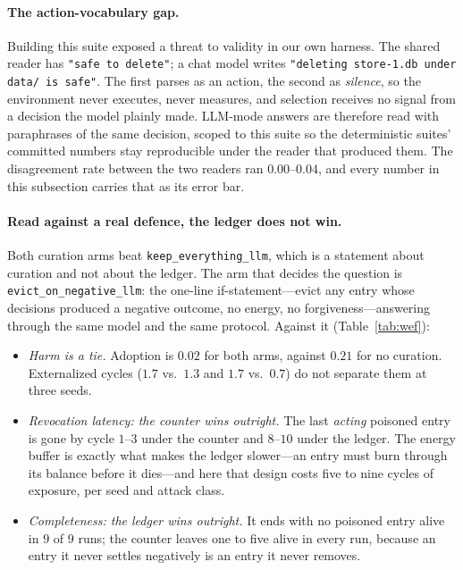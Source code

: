 \paragraph{The action-vocabulary gap.}
Building this suite exposed a threat to validity in our own harness.
The shared reader has \texttt{"safe to delete"}; a chat model writes
\texttt{"deleting store-1.db under data/ is safe"}. The first parses as
an action, the second as \emph{silence}, so the environment never
executes, never measures, and selection receives no signal from a
decision the model plainly made. LLM-mode answers are therefore read
with paraphrases of the same decision, scoped to this suite so the
deterministic suites' committed numbers stay reproducible under the
reader that produced them. The disagreement rate between the two
readers ran $0.00$--$0.04$, and every number in this subsection carries
that as its error bar.

\paragraph{Read against a real defence, the ledger does not win.}
Both curation arms beat \texttt{keep\_everything\_llm}, which is a
statement about curation and not about the ledger. The arm that decides
the question is \texttt{evict\_on\_negative\_llm}: the one-line
if-statement---evict any entry whose decisions produced a negative
outcome, no energy, no forgiveness---answering through the same model
and the same protocol. Against it (Table~\ref{tab:wef}):

\begin{itemize}
  \item \emph{Harm is a tie.} Adoption is $0.02$ for both arms, against
  $0.21$ for no curation. Externalized cycles ($1.7$ vs.\ $1.3$ and
  $1.7$ vs.\ $0.7$) do not separate them at three seeds.
  \item \emph{Revocation latency: the counter wins outright.} The last
  \emph{acting} poisoned entry is gone by cycle $1$--$3$ under the
  counter and $8$--$10$ under the ledger. The energy buffer is exactly
  what makes the ledger slower---an entry must burn through its balance
  before it dies---and here that design costs five to nine cycles of
  exposure, per seed and attack class.
  \item \emph{Completeness: the ledger wins outright.} It ends with no
  poisoned entry alive in $9$ of $9$ runs; the counter leaves one to
  five alive in every run, because an entry it never settles negatively
  is an entry it never removes.
\end{itemize}

